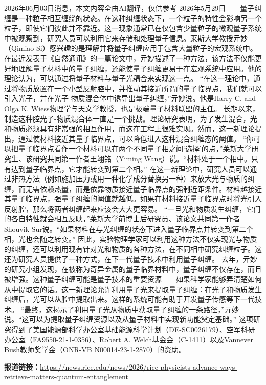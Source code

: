 \documentclass[12pt,a4paper]{ctexart}
\begin{document}
2026年06月03日消息，本文内容全由AI翻译，仅供参考
2026年5月29日——量子纠缠是一种粒子相互缠绕的状态。在这种纠缠状态下，一个粒子的特性会影响另一个粒子，即使它们彼此并不靠近。这一现象通常已在仅包含少量粒子的微观量子系统中被观察到，研究人员可以利用它来存储和处理量子信息。莱斯大学教授亓妙（Qimiao Si）感兴趣的是理解并将量子纠缠应用于包含大量粒子的宏观系统中。
在最近发表于《自然通讯》的一篇论文中，亓妙描述了一种方法，该方法不仅能更好地理解量子材料中的量子纠缠，还能使量子纠缠更易于在宏观系统中应用。他的理论认为，可以通过将量子材料与量子光耦合来实现这一点。
“在这一理论中，通过将物质放置在一个小型反射腔中，并推动其接近所谓的量子临界点，我们就可以引入光子，并在光子-物质混合体中诱导出量子纠缠，”亓妙说。他是Harry C. and Olga K. Wiess物理学与天文学教授，也是极端量子材料联盟的主任。
长期以来，制造这种腔光子-物质混合体一直是一个挑战。理论研究表明，为了发生混合，光和物质必须具有非常强的相互作用，而这在工程上很难实现。然而，这一新理论提出，通过使材料接近其量子临界点，可以降低进入这种混合纠缠态的阈值。
“你可以把量子临界点看作一个材料可以在两个不同量子相之间‘选择’的点，”莱斯大学研究生、该研究共同第一作者王翊铭（Yiming Wang）说。“材料处于一个相中。只有达到量子临界点，它才能转变到第二个相。”
在这一新理论中，研究人员可以通过非热方法（例如施加压力或用一种化学成分替换另一种）来放大光与物质的纠缠，而无需依赖热量，而是依靠物质接近量子临界点的强制近距条件。材料越接近其量子临界点，强量子纠缠的阈值就越低。如果在材料接近量子临界点时将光引入反射腔，那么将两者纠缠起来应该会大大更容易。
“一旦光和物质发生纠缠，它们的各自特性就会相互反映，”莱斯大学前博士后研究员、该论文共同第一作者Shouvik Sur说。“如果材料在与光纠缠的状态下进入量子临界点并转变到第二个相，光也会随之转变。”
因此，实验物理学家可以利用这种方法不仅实现光与物质的纠缠，还可以利用现有针对光和物质的各种方法，在不同相中研究纠缠粒子。这还为研究人员提供了一种方式，在下一代量子技术中利用量子纠缠。
去年，亓妙的研究小组发现，在被称为奇异金属的量子临界材料中，量子纠缠不仅存在，而且被增强。这种量子纠缠可能是量子技术的重要资源——如果科学家能够弄清楚如何从中提取它的话。这一新理论允许利用量子光来提取量子纠缠：在光子和物质发生纠缠后，光可以从腔中提取出来。这样的系统可能有助于开发量子传感等下一代技术。
“最终，这揭示了利用量子光从物质中获取量子纠缠的一条路径，”亓妙说。“这可以为提取量子纠缠资源以及从量子材料中实现新功能奠定基础。”
这项研究得到了美国能源部科学办公室基础能源科学计划（DE-SC0026179）、空军科研办公室（FA9550-21-1-0356）、Robert A. Welch基金会（C-1411）以及Vannever Bush教师奖学金（ONR-VB N00014-23-1-2870）的资助。

\noindent\textbf{报道链接：}\url{https://news.rice.edu/news/2026/rice-physicists-advance-ways-retrieve-matters-quantum-entanglement}
\end{document}
